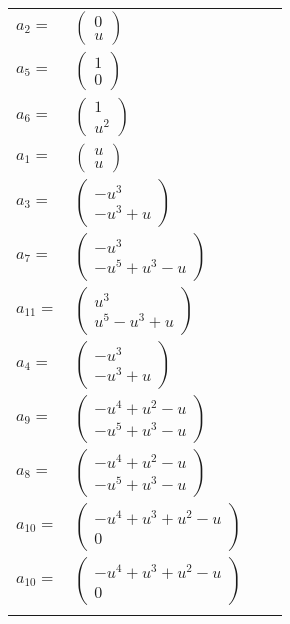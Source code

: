 \documentclass[1p]{elsarticle_modified}
\theoremstyle{definition}
\begin{document}
\begin{tabular}{m{7pt} m{180pt} m{7pt} m{180pt} }
\flushright $a_{2}=$&$\begin{pmatrix}0\\u\end{pmatrix}$ \\
\flushright $a_{5}=$&$\begin{pmatrix}1\\0\end{pmatrix}$ \\
\flushright $a_{6}=$&$\begin{pmatrix}1\\u^2\end{pmatrix}$ \\
\flushright $a_{1}=$&$\begin{pmatrix}u\\u\end{pmatrix}$ \\
\flushright $a_{3}=$&$\begin{pmatrix}- u^3\\- u^3+u\end{pmatrix}$ \\
\flushright $a_{7}=$&$\begin{pmatrix}- u^3\\- u^5+u^3- u\end{pmatrix}$ \\
\flushright $a_{11}=$&$\begin{pmatrix}u^3\\u^5- u^3+u\end{pmatrix}$ \\
\flushright $a_{4}=$&$\begin{pmatrix}- u^3\\- u^3+u\end{pmatrix}$ \\
\flushright $a_{9}=$&$\begin{pmatrix}- u^4+u^2- u\\- u^5+u^3- u\end{pmatrix}$ \\
\flushright $a_{8}=$&$\begin{pmatrix}- u^4+u^2- u\\- u^5+u^3- u\end{pmatrix}$ \\
\flushright $a_{10}=$&$\begin{pmatrix}- u^4+u^3+u^2- u\\0\end{pmatrix}$\\ \flushright $a_{10}=$&$\begin{pmatrix}- u^4+u^3+u^2- u\\0\end{pmatrix}$\\&\end{tabular}
\end{document}
